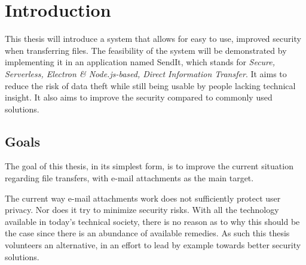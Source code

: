 








\chapter{Introduction} %
%
\label{Chapter1} %
%
\newcommand{\keyword}[1]{\textbf{#1}}
\newcommand{\tabhead}[1]{\textbf{#1}}
\newcommand{\code}[1]{\texttt{#1}}
\newcommand{\file}[1]{\texttt{\bfseries#1}}
\newcommand{\option}[1]{\texttt{\itshape#1}}

This thesis will introduce a system that allows for easy to use, improved security when transferring files. The feasibility of the system will be demonstrated by implementing it in an application named SendIt, which stands for \emph{Secure, Serverless, Electron \& Node.js-based, Direct Information Transfer}. It aims to reduce the risk of data theft while still being usable by people lacking technical insight. It also aims to improve the security compared to commonly used solutions. 
%
\section{Goals}
%
The goal of this thesis, in its simplest form, is to improve the current situation regarding file transfers, with e-mail attachments as the main target.

The current way e-mail attachments work does not sufficiently protect user privacy. Nor does it try to minimize security risks. With all the technology available in today's technical society, there is no reason as to why this should be the case since there is an abundance of available remedies. As such this thesis volunteers an alternative, in an effort to lead by example towards better security solutions.

